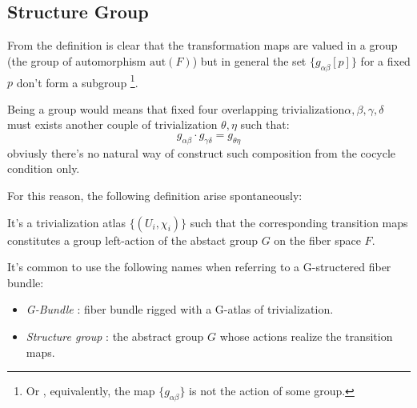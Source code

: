 \documentclass[a4paper,12pt]{scrartcl}    %
\begin{document}
\subsection{Structure Group}	
From the definition is clear that the transformation maps are valued in a  group (the group of automorphism $\textrm{aut}(F) $) but in general the set $\{ g_{\alpha \beta}[p] \}$ for a fixed $p$ don't form a subgroup \footnote{Or , equivalently, the map $\{ g_{\alpha \beta} \}$ is not the action of some group.}. 

\begin{example}
Being a group would means  that fixed four overlapping trivialization$ \alpha, \beta, \gamma, \delta$ must exists another couple of trivialization $\theta , \eta$ such that:
\begin{displaymath}
g_{\alpha \beta } \cdot g_{\gamma \delta} = g_{\theta \eta}
\end{displaymath}
obviusly there's no natural way of construct such composition from the cocycle condition only.
\end{example}

For this reason, the following definition arise spontaneously:
\begin{definition}[G-Atlas]
It's a trivialization atlas $\{ (U_i , \chi_i ) \}$ such that the corresponding transition maps constitutes a group left-action of the abstact group $G$ on the fiber space $F$.
\end{definition}

\begin{notationfix}
It's common to use the following names when referring to a G-structered fiber bundle:
\begin{itemize}
\item \emph{G-Bundle} : fiber bundle rigged with a G-atlas of trivialization.
\item \emph{Structure group} : the abstract group $G$ whose actions realize the transition maps.
\end{itemize}

\end{notationfix}
\end{document}
